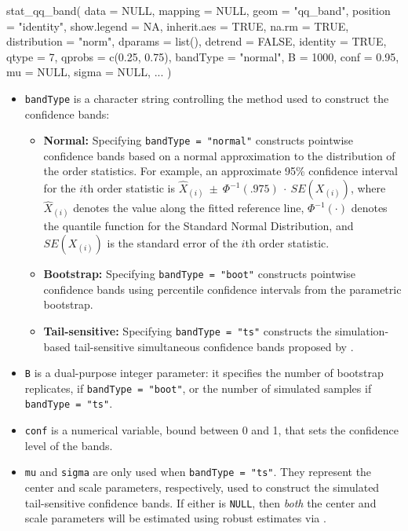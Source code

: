 \begin{Schunk}
\begin{Sinput}
stat_qq_band(
  data = NULL,
  mapping = NULL,
  geom = "qq_band",
  position = "identity",
  show.legend = NA,
  inherit.aes = TRUE,
  na.rm = TRUE,
  distribution = "norm",
  dparams = list(),
  detrend = FALSE,
  identity = TRUE,
  qtype = 7,
  qprobs = c(0.25, 0.75),
  bandType = "normal",
  B = 1000,
  conf = 0.95,
  mu = NULL,
  sigma = NULL,
  ...
  )
\end{Sinput}
\end{Schunk}

\begin{itemize}
\item
  \texttt{bandType} is a character string controlling the method used to
  construct the confidence bands:

  \begin{itemize}
  \tightlist
  \item
    \textbf{Normal:} Specifying \texttt{bandType\ =\ "normal"}
    constructs pointwise confidence bands based on a normal
    approximation to the distribution of the order statistics. For
    example, an approximate 95\% confidence interval for the \(i\)th
    order statistic is
    \linebreak \(\widehat{X}_{(i)}~\pm~\Phi^{-1}(.975)~\cdot~SE(X_{(i)})\),
    where \(\widehat{X}_{(i)}\) denotes the value along the fitted
    reference line, \(\Phi^{-1}(\cdot)\) denotes the quantile function
    for the Standard Normal Distribution, and \(SE(X_{(i)})\) is the
    standard error of the \(i\)th order statistic.
  \item
    \textbf{Bootstrap:} Specifying \texttt{bandType\ =\ "boot"}
    constructs pointwise confidence bands using percentile confidence
    intervals from the parametric bootstrap.
  \item
    \textbf{Tail-sensitive:} Specifying \texttt{bandType\ =\ "ts"}
    constructs the simulation-based tail-sensitive simultaneous
    confidence bands proposed by \citet{Aldor-Noiman2013-xw}.
  \end{itemize}
\item
  \texttt{B} is a dual-purpose integer parameter: it specifies the
  number of bootstrap replicates, if \texttt{bandType\ =\ "boot"}, or
  the number of simulated samples if \texttt{bandType\ =\ "ts"}.
\item
  \texttt{conf} is a numerical variable, bound between 0 and 1, that
  sets the confidence level of the bands.
\item
  \texttt{mu} and \texttt{sigma} are only used when
  \texttt{bandType\ =\ "ts"}. They represent the center and scale
  parameters, respectively, used to construct the simulated
  tail-sensitive confidence bands. If either is \texttt{NULL}, then
  \emph{both} the center and scale parameters will be estimated using
  robust estimates via  \citep{robustbase}.
\end{itemize}

